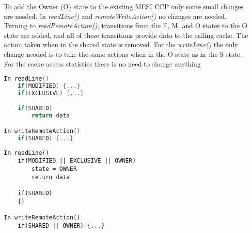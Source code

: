 To add the Owner (O) state to the existing MESI CCP only some small changes are needed. In \textit{readLine()} and \textit{remoteWriteAction()} no changes are needed. Turning to \textit{readRemoteAction()}, transitions from the E, M, and O states to the O state are added, and all of these transitions provide data to the calling cache. The action taken when in the shared state is removed. For the \textit{writeLine()} the only change needed is to take the same actions when in the O state as in the S state. For the cache access statistics there is no need to change anything

\par\noindent
\begin{minipage}[t]{.5\textwidth}
\begin{lstlisting}[language=C,frame=lrtb]
In readLine()
	if(MODIFIED) {...}
	if(EXCLUSIVE) {...}

	if(SHARED)
		return data		

In writeRemoteAction()
	if(SHARED) {...}
\end{lstlisting}%
\end{minipage}%
\hfill
\begin{minipage}[t]{.5\textwidth}
\begin{lstlisting}[frame=lrtb]
In readLine()
	if(MODIFIED || EXCLUSIVE || OWNER) 
		state = OWNER
		return data

	if(SHARED)
	{}

In writeRemoteAction()
	if(SHARED || OWNER) {...}
\end{lstlisting}%
\end{minipage}%
